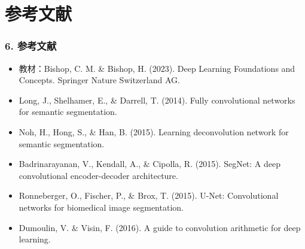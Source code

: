 \documentclass[t,aspectratio=169]{beamer} %
\begin{document}
\section{参考文献}

\begin{frame}
    \frametitle{6. 参考文献}
    \begin{itemize}
        \item 教材：Bishop, C. M. \& Bishop, H. (2023). Deep Learning Foundations and Concepts. Springer Nature Switzerland AG.
        \item Long, J., Shelhamer, E., \& Darrell, T. (2014). Fully convolutional networks for semantic segmentation.
        \item Noh, H., Hong, S., \& Han, B. (2015). Learning deconvolution network for semantic segmentation.
        \item Badrinarayanan, V., Kendall, A., \& Cipolla, R. (2015). SegNet: A deep convolutional encoder-decoder architecture.
        \item Ronneberger, O., Fischer, P., \& Brox, T. (2015). U-Net: Convolutional networks for biomedical image segmentation.
        \item Dumoulin, V. \& Visin, F. (2016). A guide to convolution arithmetic for deep learning.
    \end{itemize}
\end{frame}
\end{document}
